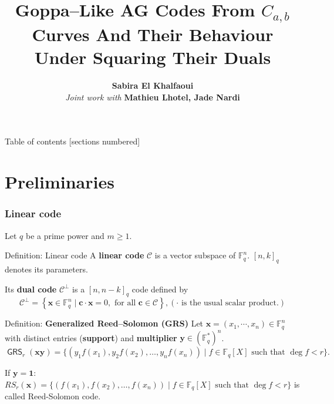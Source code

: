 \documentclass[
10pt, %
%
aspectratio=169, %
]{beamer}
\title[Goppa-Like AG codes Distinguisher]{Goppa–Like AG Codes From $C_{a,b}$ Curves And Their Behaviour Under Squaring Their Duals}
\author[SEK]{\textbf{Sabira El Khalfaoui} \vspace{0.3cm}\\\vspace{1cm} \textit{\textcolor{ballblue}{Joint work with}} \textbf{Mathieu Lhotel, Jade Nardi}}
\institute[]{\large{\textbf{IRMAR} \\ \smallskip \textit{\textcolor{ballblue}{GAE seminar}}}}
\date[Mai 2023]
\theoremstyle{plain}%
\theoremstyle{definition}
\theoremstyle{remark}
\newcommand{\calC}{\mathcal{C}}
\newcommand{\fq}{\mathbb{F}_{q}}
\newcommand{\GRS}{\operatorname{\mathsf{GRS}}}
\begin{document}
	
	\maketitle
	
	\begin{frame}{Table of contents}
		[sections numbered]
		\tableofcontents%
	\end{frame}
	
	\section{Preliminaries}
	
	\begin{frame}
		\frametitle{Linear code}
		Let $q$ be a prime power and $m \geq 1$. 
		\begin{block}{Definition: Linear code}
			A \textbf{linear code} $\calC$ is a vector subspace of $\fq^n$. $[n,k]_{q}$ denotes its parameters.
		\end{block}

	 Its \textbf{dual code} $\calC^{\perp}$ is a $[n,n-k]_{q}$ code defined by 
	\[\calC^{\perp}=\left\lbrace \mathbf{x} \in \fq^n \mid \mathbf{c} \cdot \mathbf{x}=0, \text{ for all } \mathbf{c} \in \calC \right\rbrace, (\text{$\cdot$ is the usual scalar product.})\]  
	
		\begin{block}{Definition: \textbf{Generalized Reed--Solomon (GRS)}}
			Let $\mathbf{x}=(x_1,\cdots,x_n) \in \fq^n$  with distinct entries (\textbf{support}) and \textbf{multiplier} $\mathbf{y} \in (\fq^*)^n$.
			\vspace{-0.7em}
			\[\GRS_r(\mathbf{x} \mathbf{y})=\{(y_1f(x_1),y_2f(x_2),\dots,y_nf(x_n)) \mid f \in \fq[X] \text{ such that } \deg f < r \}.\]
		\end{block}
	\begin{tcolorbox}[colback=aliceblue]
If $\mathbf{y} = \mathbf{1}$:\\
	$RS_r(\mathbf{x})=\{(f(x_1),f(x_2),\dots,f(x_n)) \mid f \in \fq[X] \text{ such that } \deg f < r \}$
		is called Reed-Solomon code.
	\end{tcolorbox}
\vspace{-0.9em}
	\end{frame}
\end{document}

